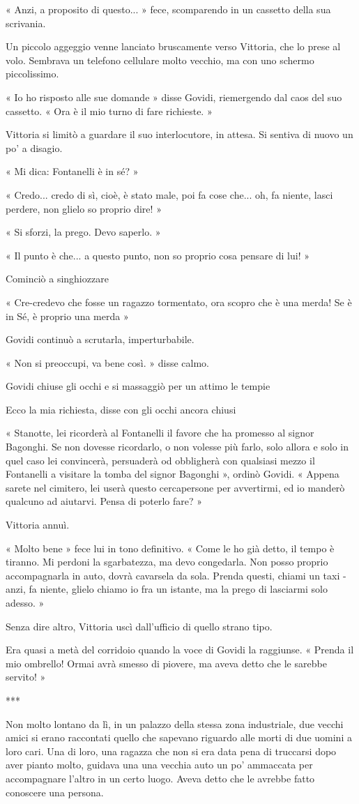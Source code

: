 « Anzi, a proposito di questo... » fece, scomparendo in un cassetto della sua scrivania.

Un piccolo aggeggio venne lanciato bruscamente verso Vittoria, che lo prese al volo. Sembrava un telefono cellulare molto vecchio, ma con uno schermo piccolissimo.

« Io ho risposto alle sue domande » disse Govidi, riemergendo dal caos del suo cassetto. « Ora è il mio turno di fare richieste. »

Vittoria si limitò a guardare il suo interlocutore, in attesa. Si sentiva di nuovo un po' a disagio.

« Mi dica: Fontanelli è in sé? »

« Credo... credo di sì, cioè, è stato male, poi fa cose che... oh, fa niente, lasci perdere, non glielo so proprio dire! »

« Si sforzi, la prego. Devo saperlo. »

« Il punto è che... a questo punto, non so proprio cosa pensare di lui! »

Cominciò a singhiozzare

« Cre-credevo che fosse un ragazzo tormentato, ora scopro che è una merda! Se è in Sé, è proprio una merda »

Govidi continuò a scrutarla, imperturbabile.

« Non si preoccupi, va bene così. » disse calmo. 

Govidi chiuse gli occhi e si massaggiò per un attimo le tempie

Ecco la mia richiesta, disse con gli occhi ancora chiusi

« Stanotte, lei ricorderà al Fontanelli il favore che ha promesso al signor Bagonghi. Se non dovesse ricordarlo, o non volesse più farlo, solo allora e solo in quel caso lei convincerà, persuaderà od obbligherà con qualsiasi mezzo il Fontanelli a visitare la tomba del signor Bagonghi », ordinò Govidi. « Appena sarete nel cimitero, lei userà questo cercapersone per avvertirmi, ed io manderò qualcuno ad aiutarvi. Pensa di poterlo fare? »

Vittoria annuì.

« Molto bene » fece lui in tono definitivo. « Come le ho già detto, il tempo è tiranno. Mi perdoni la sgarbatezza, ma devo congedarla. Non posso proprio accompagnarla in auto, dovrà cavarsela da sola. Prenda questi, chiami un taxi - anzi, fa niente, glielo chiamo io fra un istante, ma la prego di lasciarmi solo adesso. »

Senza dire altro, Vittoria uscì dall'ufficio di quello strano tipo.

Era quasi a metà del corridoio quando la voce di Govidi la raggiunse. « Prenda il mio ombrello! Ormai avrà smesso di piovere, ma aveva detto che le sarebbe servito! »

***

Non molto lontano da lì, in un palazzo della stessa zona industriale, due vecchi amici si erano raccontati quello che sapevano riguardo alle morti di due uomini a loro cari. Una di loro, una ragazza che non si era data pena di truccarsi dopo aver pianto molto, guidava una una vecchia auto un po' ammaccata per accompagnare l'altro in un certo luogo. Aveva detto che le avrebbe fatto conoscere una persona.
